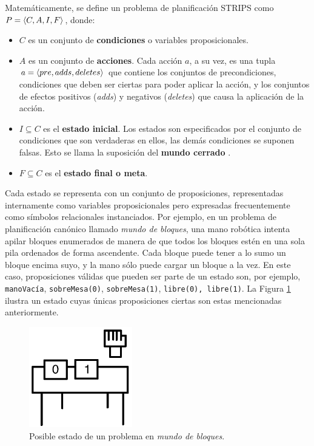 \begin{definition}
\label{definicion_planificacion}
Matemáticamente, se define un problema de planificación STRIPS como $P = \langle C, A, I,
F \rangle$, donde: 
\begin{itemize} 
\item $C$ es un conjunto de \textbf{condiciones} o variables proposicionales.
\item $A$ es un conjunto de \textbf{acciones}. Cada acción $a$, a su vez, es
una tupla $a = \langle pre, adds, deletes \rangle$ que contiene los conjuntos de
precondiciones, condiciones que deben ser ciertas para poder aplicar la acción,
y los conjuntos de efectos
positivos (\textit{adds}) y negativos (\textit{deletes}) que causa la
aplicación de la acción.
\item $I \subseteq C$ es el \textbf{estado inicial}. Los estados son
especificados por el conjunto de condiciones que son verdaderas en ellos, las
demás condiciones se suponen falsas. Esto se llama la suposición del
\textbf{mundo cerrado} \citep{russell:book}.
\item $F \subseteq C$ es el \textbf{estado final o meta}.
\end{itemize}
\end{definition}

Cada estado se representa con un conjunto de proposiciones, representadas
internamente como variables proposicionales pero expresadas frecuentemente como
símbolos relacionales instanciados.
Por ejemplo, en un problema de
planificación canónico llamado \textit{mundo de bloques}, una mano
robótica intenta apilar bloques enumerados de manera de que todos los bloques
estén en una sola pila ordenados de forma ascendente. Cada bloque puede tener a
lo sumo un bloque encima suyo, y la mano sólo puede cargar un bloque a la vez.
En este caso, proposiciones válidas que pueden ser parte de un estado son,
por ejemplo,
\texttt{manoVacía}, \texttt{sobreMesa(0)}, \texttt{sobreMesa(1)}, \texttt{libre(0),
\texttt{libre(1)}}.
La Figura \ref{blocksworld_inicial} ilustra un estado cuyas únicas
proposiciones ciertas son estas mencionadas anteriormente.
\begin{figure}[h!]
\centering
\includegraphics[width=0.4\textwidth]{figuras/blocksworld_inicial.png}
\caption[Ejemplo de estado inicial en \textit{mundo de bloques}]{Posible estado de un problema en \textit{mundo de bloques}.}
\label{blocksworld_inicial}
\end{figure}


